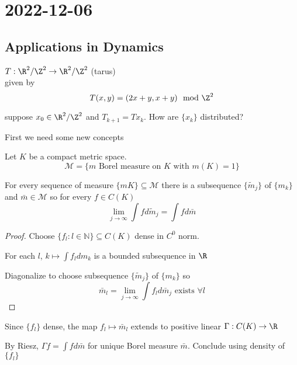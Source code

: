 \section{2022-12-06}

\subsection{Applications in Dynamics}

\begin{definition}
	$T : \R^2 / \Z^2 \to \R^2 / \Z^2$ (tarus) \\
	given by
	\[
		T(x,y) = (2x + y, x+y) \mod{\Z^2}
	\] 
\end{definition}

suppose $x_0 \in \R^2 / \Z^2$ and $T_{k+1} = T x_{k}$. How are $\{x_k\}$ distributed?


First we need some new concepts

\begin{definition}
	Let $K$ be a compact metric space.
	\[
		\mathcal{M} = \{ m \text{ Borel measure on $K$ with } m(K) = 1 \}
	\] 
\end{definition}

\begin{theorem}
	For every sequence of measure $\{m K \} \subseteq \mathcal{M}$ there is a subsequence
	$\{ \tilde{m}_{j}\}$ of $\{ m_k\}$ and $\bar{m} \in \mathcal{M}$ so for every $f \in C(K)$
	 \[
		 \lim_{j \to \infty} \int f d\tilde{m}_{j} = \int f d \bar{m}
	\] 
\end{theorem}

\begin{proof}
	Choose $\{ f_l : l \in \mathbb{N} \} \subseteq C(K)$ dense in $C^0$ norm.

	For each $l$, $k \mapsto \int f_{l} dm_k$ is a bounded subsequence in $\R$ 

	Diagonalize to choose subsequence $\{\tilde{m}_{j} \}$ of $\{m_k \}$ so
	\[
		\bar{m}_{l} = \lim_{j \to \infty} \int f_{l} d \bar{m}_j \text{ exists } \forall l
	\] 
\end{proof}

\begin{exercise}
	Since $\{f_l \}$ dense, the map $f_{l} \mapsto \bar{m}_l$ extends to positive linear $\Gamma : C(K) \to \R$

	By Riesz,  $\Gamma f = \int f d \bar{m}$ for unique Borel measure $\bar{m}$. Conclude using density of $\{f_l\}$
\end{exercise}

